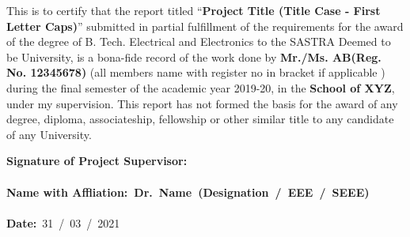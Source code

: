 \documentclass[a4paper, 12pt, oneside]{sastra}
\begin{document}
	
	
	
	
	
	
	\newpage
	
	\setcounter{page}{2}
	
	\certificate
	
	
	\begin{doublespace}
		\linespread{2}
		
		This is to certify that the report titled ``\textbf{Project Title (Title Case - First Letter Caps)}'' submitted in partial fulfillment of the requirements for the award of the degree of B. Tech. Electrical and Electronics to the SASTRA Deemed to be University, is a bona-fide record of the work done by \textbf{Mr./Ms. AB(Reg. No. 12345678)} (all members name with register no in bracket if applicable ) during the final semester of the academic year 2019-20, in the \textbf{School of XYZ}, under my supervision. This report has not formed the basis for the award of any degree, diploma, associateship, fellowship or other similar title to any candidate of any University.
		
	\end{doublespace}
	\vspace*{0.4in}
	
\noindent\textbf{Signature of Project Supervisor:}~	\\ %
\\
\textbf{Name with Affliation\hspace*{19mm}:~\textbf{Dr.~Name}~(Designation~/~EEE~/~SEEE)}	\\
\\
	\textbf{Date\hspace*{48.25mm}:}~31~/~03~/~2021\\%
	
\end{document}
